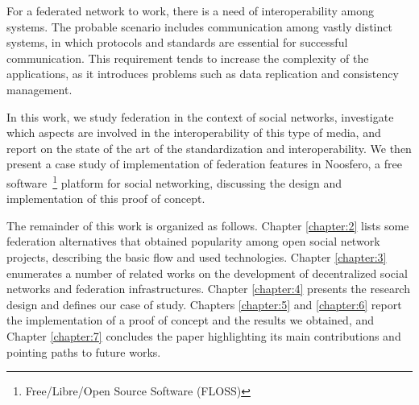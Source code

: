 For a federated network to work, there is a need of interoperability
among systems. The probable scenario includes communication among
vastly distinct systems, in which protocols and standards are essential
for successful communication. This requirement tends to increase the
complexity of the applications, as it introduces problems such as data
replication and consistency management.

In this work, we study federation in the context of social networks,
investigate which aspects are involved in the interoperability of this type of
media, and report on the state of the art of the standardization and
interoperability. We then present a case study of implementation of federation
features in Noosfero, a free software~\footnote{Free/Libre/Open Source Software
(FLOSS)} platform for social networking, discussing the design and
implementation of this proof of concept.

The remainder of this work is organized as follows. Chapter \ref{chapter:2} lists
some federation alternatives that obtained popularity among open social network
projects, describing the basic flow and used technologies. Chapter \ref{chapter:3}
enumerates a number of related works on the development of decentralized social
networks and federation infrastructures. Chapter \ref{chapter:4} presents the
research design and defines our case of study. Chapters \ref{chapter:5} and
\ref{chapter:6} report the implementation of a proof of concept and the results we
obtained, and Chapter \ref{chapter:7} concludes the paper highlighting its main
contributions and pointing paths to future works.
